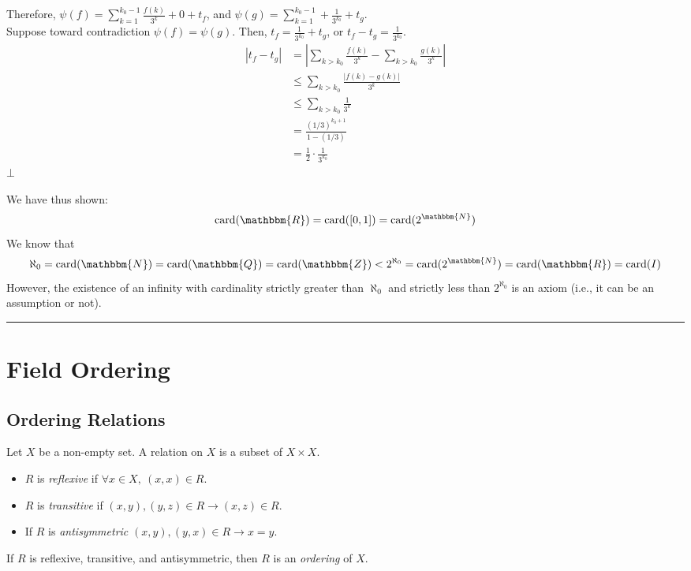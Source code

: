 \documentclass[10pt]{extarticle}
\newcommand{\card}{\text{card}}
\newcommand{\N}{\mathbbm{N}}
\newcommand{\Q}{\mathbbm{Q}}
\newcommand{\Z}{\mathbbm{Z}}
\newcommand{\R}{\mathbbm{R}}
\begin{document}
\begin{description}
          Therefore, $\psi(f) = \sum_{k = 1}^{k_0-1}\frac{f(k)}{3^k} + 0 + t_f$, and $\psi(g) = \sum_{k=1}^{k_0-1} + \frac{1}{3^{k_0}} + t_g$.\\

          Suppose toward contradiction $\psi(f) = \psi(g)$. Then, $t_f = \frac{1}{3^{k_0}} + t_g$, or $t_f - t_g = \frac{1}{3^{k_0}}$.
          \begin{align*}
            |t_f-t_g| &= |\sum_{k>k_0}\frac{f(k)}{3^k} - \sum_{k>k_0}\frac{g(k)}{3^k}|\\
                      &\leq \sum_{k>k_0}\frac{|f(k)-g(k)|}{3^k}\\
                      &\leq \sum_{k>k_0}\frac{1}{3^{k}}\\
                      &= \frac{(1/3)^{k_0+1}}{1-(1/3)}\\
                      &= \frac{1}{2}\cdot\frac{1}{3^{k_0}}
          \end{align*}
          $\bot$
    \end{description}
    We have thus shown:
    \[
      \card(\R) = \card([0,1]) = \card(2^{\N})
    \] 
    We know that \[\aleph_0 = \card(\N) = \card(\Q) = \card(\Z) < 2^{\aleph_0} = \card(2^{\N}) = \card(\R) = \card(I)\] However, the existence of an infinity with cardinality strictly greater than $\aleph_0$ and strictly less than $2^{\aleph_0}$ is an axiom (i.e., it can be an assumption or not).\\
    \vspace{4pt}
    \rule{\textwidth}{0.4pt}
    \vspace{4pt}
  \section{Field Ordering}%
  \subsection{Ordering Relations}%
    Let $X$ be a non-empty set. A relation on $X$ is a subset of $X\times X$.
    \begin{itemize}
      \item $R$ is \textsl{reflexive} if $\forall x\in X,~(x,x)\in R$.
      \item $R$ is \textsl{transitive} if $(x,y),(y,z)\in R \rightarrow (x,z)\in R$.
      \item If $R$ is \textsl{antisymmetric} $(x,y),(y,x)\in R\rightarrow x=y$. 
    \end{itemize}
    If $R$ is reflexive, transitive, and antisymmetric, then $R$ is an \textsl{ordering} of $X$.\\
\end{document}
